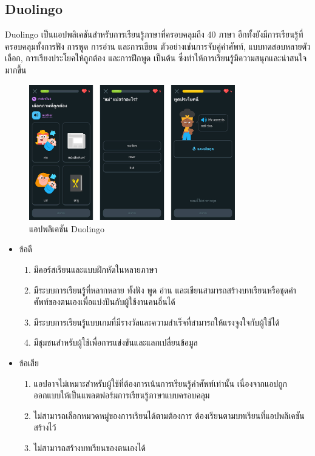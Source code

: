 \documentclass[12pt,oneside,openright,a4paper]{cpe-thai-project}
\begin{document}
\pagebreak
\subsection{Duolingo \cite{Duolingo}}

\hspace{1cm}
Duolingo เป็นแอปพลิเคชันสำหรับการเรียนรู้ภาษาที่ครอบคลุมถึง 40 ภาษา อีกทั้งยังมีการเรียนรู้ที่ครอบคลุมทั้งการฟัง การพูด การอ่าน และการเขียน
ตัวอย่างเช่นการจับคู่คำศัพท์, แบบทดสอบหลายตัวเลือก, การเรียงประโยคให้ถูกต้อง และการฝึกพูด เป็นต้น ซึ่งทำให้การเรียนรู้มีความสนุกและน่าสนใจมากขึ้น

\begin{figure}[!h]\centering
	\includegraphics[width=0.8\textwidth, keepaspectratio=true]{image/chap2/duolingoEX.png}
	\caption{แอปพลิเคชัน Duolingo}\label{fig:duolingoEX}
\end{figure}

\begin{itemize}
	\item ข้อดี
	      \begin{enumerate}
		      \item มีคอร์สเรียนและแบบฝึกหัดในหลายภาษา
		      \item มีระบบการเรียนรู้ที่หลากหลาย ทั้งฟัง พูด อ่าน และเขียนสามารถสร้างบทเรียนหรือชุดคำศัพท์ของตนเองเพื่อแบ่งปันกับผู้ใช้งานคนอื่นได้
		      \item มีระบบการเรียนรู้แบบเกมที่มีรางวัลและความสำเร็จที่สามารถให้แรงจูงใจกับผู้ใช้ได้
		      \item มีชุมชนสำหรับผู้ใช้เพื่อการแข่งขันและแลกเปลี่ยนข้อมูล
	      \end{enumerate}
	\item ข้อเสีย
	      \begin{enumerate}
		      \item แอปอาจไม่เหมาะสำหรับผู้ใช้ที่ต้องการเน้นการเรียนรู้คำศัพท์เท่านั้น เนื่องจากแอปถูกออกแบบให้เป็นแพลตฟอร์มการเรียนรู้ภาษาแบบครอบคลุม
		      \item ไม่สามารถเลือกหมวดหมู่ของการเรียนได้ตามต้องการ ต้องเรียนตามบทเรียนที่แอปพลิเคชันสร้างไว้
		      \item ไม่สามารถสร้างบทเรียนของตนเองได้
	      \end{enumerate}
\end{itemize}
\end{document}
